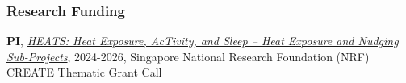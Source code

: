 \documentclass[10pt,a4paper]{article}
\begin{document}
\begin{small}
\subsubsection*{Research Funding}






\begin{etaremune}


  \item \textbf{PI}, \href{https://www.linkedin.com/company/project-heats/}{\emph{HEATS: Heat Exposure, AcTivity, and Sleep -- Heat Exposure and Nudging Sub-Projects}}, 2024-2026, Singapore National Research Foundation (NRF) CREATE Thematic Grant Call%


\end{etaremune}
\end{small}
\end{document}

